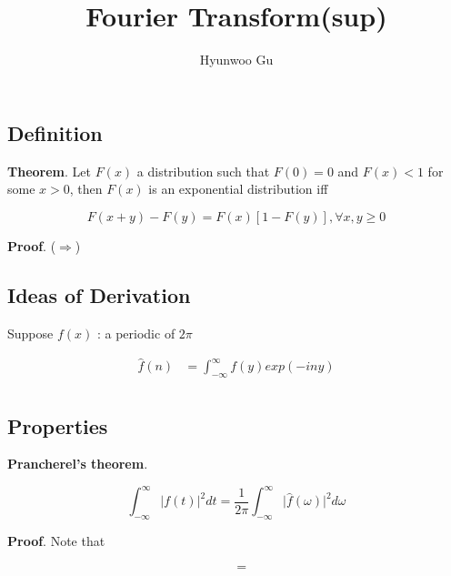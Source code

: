 \documentclass[12pt]{article}
\theoremstyle{nonumberbreak}
\begin{document}
\title{\textbf{Fourier Transform(sup)}}
\author{Hyunwoo Gu}
\date{}

\maketitle


\subsection*{Definition}

\begin{theorem}
\textbf{Theorem}. Let $F(x)$ a distribution such that $F(0) = 0$ and $F(x) < 1$ for some $x >0 $, then $F(x)$ is an exponential distribution iff

$$
F(x+y) - F(y) = F(x)[1-F(y)], \forall x,y \ge 0
$$
\end{theorem}

\textbf{Proof}. ($\Rightarrow$) 





\subsection*{Ideas of Derivation}

Suppose $f(x)$ : a periodic of $2\pi$

$$
\begin{aligned}
\hat{f}(n) &= \int_{-\infty}^\infty f(y) exp(-iny) \\[8pt]
\end{aligned}
$$


\subsection*{Properties}

\begin{theorem}
\textbf{Prancherel's theorem}. 

$$
\int_{-\infty}^\infty \vert f(t) \vert^2 dt = \frac{1}{2\pi} \int_{-\infty}^\infty \vert \hat{f}(\omega) \vert^2 d\omega
$$

\end{theorem}

\textbf{Proof}. Note that 

$$
\begin{aligned}
 &= \\[8pt]
\end{aligned}
$$
\end{document}
